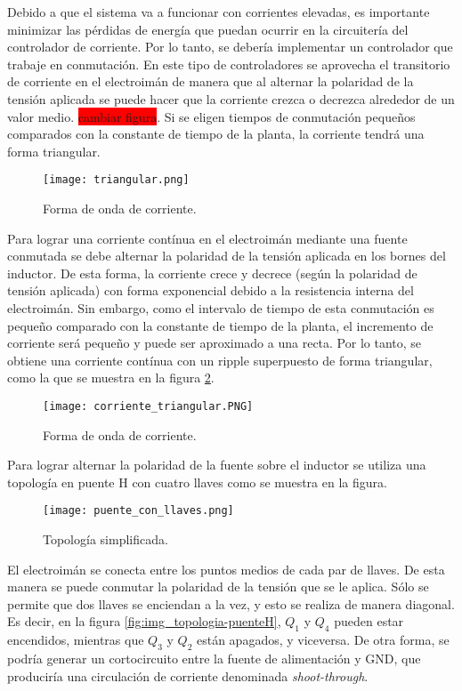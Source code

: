 Debido a que el sistema va a funcionar con corrientes elevadas, es importante minimizar las pérdidas de energía que puedan ocurrir en la circuitería del controlador de corriente. Por lo tanto, se debería implementar un controlador que trabaje en conmutación.  En este tipo de controladores se aprovecha el transitorio de corriente en el electroimán de manera que al alternar la polaridad de la tensión aplicada se puede hacer que la corriente crezca o decrezca alrededor de un valor medio. \colorbox{red}{cambiar figura}. Si se eligen tiempos de conmutación pequeños comparados con la constante de tiempo de la planta, la corriente tendrá una forma triangular.

\begin{figure}[H]
	\centering
	\texttt{[image: triangular.png]}
	\caption{Forma de onda de corriente.}
	\label{fig:img_corriente_triangular}
\end{figure}


\noindent Para lograr una corriente contínua en el electroimán mediante una fuente conmutada se debe alternar la polaridad de la tensión aplicada en los bornes del inductor. De esta forma, la corriente crece y decrece (según la polaridad de tensión aplicada) con forma exponencial debido a la resistencia interna del electroimán. Sin embargo, como el intervalo de tiempo de esta conmutación es pequeño comparado con la constante de tiempo de la planta, el incremento de corriente será pequeño y puede ser aproximado a una recta. Por lo tanto, se obtiene una corriente contínua con un ripple superpuesto de forma triangular, como la que se muestra en la figura \ref{fig:img_corriente_triangular_2}. 

\begin{figure}[H]
	\centering
	\texttt{[image: corriente\_triangular.PNG]}
	\caption{Forma de onda de corriente.}
	\label{fig:img_corriente_triangular_2}
\end{figure}


\noindent Para lograr alternar la polaridad de la fuente sobre el inductor se utiliza una topología en puente H con cuatro llaves como se  muestra en la figura.

\begin{figure}[H]
	\centering
	\texttt{[image: puente\_con\_llaves.png]}
	\caption{Topología simplificada.}
	\label{fig:img_topologia_simplificada}
\end{figure} 

El electroimán se conecta entre los puntos medios de cada par de llaves. De esta manera se puede conmutar la polaridad de la tensión que se le aplica. Sólo se permite que dos llaves se enciendan a la vez, y esto se realiza de manera diagonal. Es decir, en la figura \ref{fig:img_topologia-puenteH}, $Q_1$ y $Q_4$ pueden estar encendidos, mientras que $Q_3$ y $Q_2$ están apagados, y viceversa. De otra forma, se podría generar un cortocircuito entre la fuente de alimentación y GND, que produciría una circulación de corriente denominada \textsl{shoot-through}.

